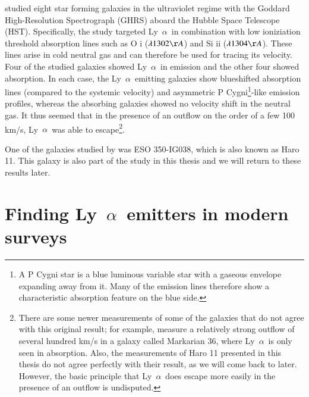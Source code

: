 \documentclass[a4wide,12pt]{book}
\newcommand{\lya}{Ly~${\alpha}$}
\begin{document}
{\citet{kunth-1998} studied eight star forming galaxies in the ultraviolet regime with the Goddard High-Resolution Spectrograph (GHRS) aboard the Hubble Space Telescope (HST). Specifically, the study targeted \lya\ in combination with low ioniziation threshold absorption lines such as O {\sc i} ($\lambda 1302 \AA$) and Si {\sc ii} ($\lambda 1304 \AA$). These lines arise in cold neutral gas and can therefore be used for tracing its velocity. Four of the studied galaxies showed \lya\ in emission and the other four showed absorption. In each case, the \lya\ emitting galaxies show blueshifted absorption lines (compared to the systemic velocity) and asymmetric P Cygni\footnote{A P Cygni star is a blue luminous variable star with a gaseous envelope expanding away from it. Many of the emission lines therefore show a characteristic absorption feature on the blue side.}-like emission profiles, whereas the absorbing galaxies showed no velocity shift in the neutral gas. It thus seemed that in the presence of an outflow on the order of a few 100 km/s, \lya\ was able to escape\footnote{There are some newer measurements of some of the galaxies that do not agree with this original result; for example, \citet{schwartz-2006} measure a relatively strong outflow of several hundred km/s in a galaxy called Markarian 36, where \lya\ is only seen in absorption. Also, the measurements of Haro 11 presented in this thesis do not agree perfectly with their result, as we will come back to later. However, the basic principle that \lya\ does escape more easily in the presence of an outflow is undisputed.}.

One of the galaxies studied by \citet{kunth-1998} was ESO 350-IG038, which is also known as Haro 11. This galaxy is also part of the study in this thesis and we will return to these results later.

\section{Finding \lya\ emitters in modern surveys}

}
\end{document}
